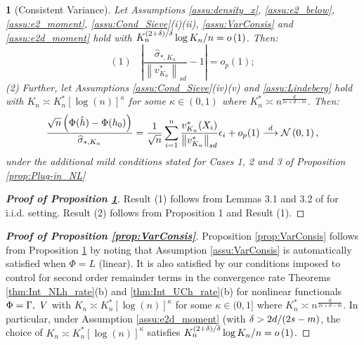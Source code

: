 \documentclass[12pt,american]{article}
\theoremstyle{definition}
\theoremstyle{plain}
\theoremstyle{definition}
\theoremstyle{plain}
\theoremstyle{plain}
\theoremstyle{plain}
\theoremstyle{plain}
\newtheorem{prop}{\protect\propositionname}
\theoremstyle{plain}
\newcommand{\norm}[1]{\left\| #1 \right\|}
\newcommand{\abs}[1]{\left| #1 \right|}
\providecommand{\propositionname}{Proposition}
\begin{document}
\begin{prop}[Consistent Variance]\label{prop:VarConsis-CC}
Let Assumptions \ref{assu:density_x}, \ref{assu:e2_below}, \ref{assu:e2_moment}, \ref{assu:Cond_Sieve}(i)(ii), \ref{assu:VarConsis} and \ref{assu:e2d_moment} hold with $K_{n}^{(2+\delta)/\delta}\log K_{n}/n=o\left(1\right)$. Then:
\[
(1)~~~~\abs{\frac{\widehat{\sigma}_{*,K_{n}}}{\norm{v_{K_{n}}^{*}}_{sd} } - 1} =o_p(1);
\]
(2) Further, let Assumptions \ref{assu:Cond_Sieve}(iv)(v) and \ref{assu:Lindeberg} hold with  $K_{n}\asymp K^*_n [\log(n)]^{\kappa}$ for some $\kappa \in (0,1)$ where $K_{n}^{*}\asymp n^{\frac{d}{2s+d-m}}$. Then:
\[
\frac{\sqrt{n}\left(\Phi(\hat{h})-\Phi(h_0)\right)}{\widehat{\sigma}_{*,K_{n}}} = \frac{1}{\sqrt{n}}\sum_{i=1}^n \frac{v_{K_n}^*(X_i)}{\norm{v_{K_{n}}^{*}}_{sd}}\e_i +o_p(1)\dto\cN\left(0,1\right),
\]
under the additional mild conditions stated for Cases 1, 2 and 3 of Proposition \ref{prop:Plug-in_NL}
\end{prop}

\begin{proof}[\textbf{Proof of Proposition \ref{prop:VarConsis-CC}}] Result (1) follows from Lemmas 3.1 and 3.2 of \cite{chen2015optimal} for i.i.d. setting. Result (2) follows from Proposition 1 and Result (1).
%
\end{proof}

\begin{proof}[\textbf{Proof of Proposition \ref{prop:VarConsis}}]
Proposition \ref{prop:VarConsis} follows from Proposition \ref{prop:VarConsis-CC} by noting that Assumption \ref{assu:VarConsis} is automatically satisfied when $\Phi=L$ (linear). It is also satisfied by our conditions imposed to control for second order remainder terms in the convergence rate Theorems \ref{thm:Int_NLh_rate}(b) and \ref{thm:Int_UCh_rate}(b) for nonlinear functionals $\Phi=\Gamma,~V$ with $K_{n}\asymp K^*_n [\log(n)]^{\kappa}$ for some $\kappa \in (0,1]$ where $K_{n}^{*}\asymp n^{\frac{d}{2s+d-m}}$. In particular, under Assumption \ref{assu:e2d_moment} (with $\delta>2d/(2s-m)$, the choice of $K_{n}\asymp K^*_n [\log(n)]^{\kappa}$ satisfies $K_{n}^{(2+\delta)/\delta}\log K_{n}/n=o\left(1\right)$.
\end{proof}
\end{document}
